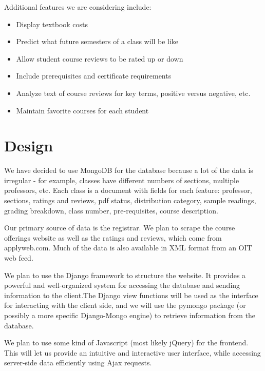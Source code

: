 \documentclass[11pt]{article}
\begin{document}
\par Additional features we are considering include:
\begin{itemize}
\item Display textbook costs
\item Predict what future semesters of a class will be like
\item Allow student course reviews to be rated up or down
\item Include prerequisites and certificate requirements
\item Analyze text of course reviews for key terms, positive versus negative, etc.
\item Maintain favorite courses for each student
\end{itemize}

\section{Design}
\par We have decided to use MongoDB for the database because a lot of the data is irregular - for example, classes have different numbers of sections, multiple professors, etc. Each class is a document with fields for each feature: professor, sections, ratings and reviews, pdf status, distribution category, sample readings, grading breakdown, class number, pre-requisites, course description.
\par Our primary source of data is the registrar. We plan to scrape the course offerings website as well as the ratings and reviews, which come from applyweb.com. Much of the data is also available in XML format from an OIT web feed.
\par We plan to use the Django framework to structure the website. It provides a powerful and well-organized system for accessing the database and sending information to the client.The Django view functions will be used as the interface for interacting with the client side, and we will use the pymongo package (or possibly a more specific Django-Mongo engine) to retrieve information from the database.
\par We plan to use some kind of Javascript (most likely jQuery) for the frontend. This will let us provide an intuitive and interactive user interface, while accessing server-side data efficiently using Ajax requests.
\end{document}
